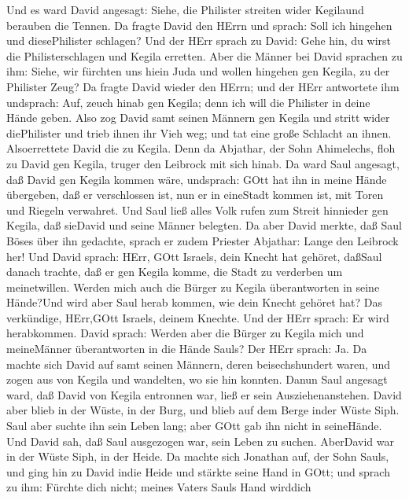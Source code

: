  Und es ward David angesagt: Siehe, die Philister streiten
wider Kegilaund berauben die Tennen.  Da fragte David den
HErrn und sprach: Soll ich hingehen und diesePhilister schlagen? Und der
HErr sprach zu David: Gehe hin, du wirst die Philisterschlagen und
Kegila erretten.  Aber die Männer bei David sprachen zu ihm:
Siehe, wir fürchten uns hiein Juda und wollen hingehen gen Kegila, zu
der Philister Zeug?  Da fragte David wieder den HErrn; und
der HErr antwortete ihm undsprach: Auf, zeuch hinab gen Kegila; denn ich
will die Philister in deine Hände geben.  Also zog David
samt seinen Männern gen Kegila und stritt wider diePhilister und trieb
ihnen ihr Vieh weg; und tat eine große Schlacht an ihnen. Alsoerrettete
David die zu Kegila.  Denn da Abjathar, der Sohn Ahimelechs,
floh zu David gen Kegila, truger den Leibrock mit sich hinab.
 Da ward Saul angesagt, daß David gen Kegila kommen wäre,
undsprach: GOtt hat ihn in meine Hände übergeben, daß er verschlossen
ist, nun er in eineStadt kommen ist, mit Toren und Riegeln verwahret.
 Und Saul ließ alles Volk rufen zum Streit hinnieder gen
Kegila, daß sieDavid und seine Männer belegten.  Da aber
David merkte, daß Saul Böses über ihn gedachte, sprach er zudem Priester
Abjathar: Lange den Leibrock her!  Und David sprach: HErr,
GOtt Israels, dein Knecht hat gehöret, daßSaul danach trachte, daß er
gen Kegila komme, die Stadt zu verderben um meinetwillen. 
Werden mich auch die Bürger zu Kegila überantworten in seine Hände?Und
wird aber Saul herab kommen, wie dein Knecht gehöret hat? Das
verkündige, HErr,GOtt Israels, deinem Knechte. Und der HErr sprach: Er
wird herabkommen.  David sprach: Werden aber die Bürger zu
Kegila mich und meineMänner überantworten in die Hände Sauls? Der HErr
sprach: Ja.  Da machte sich David auf samt seinen Männern,
deren beisechshundert waren, und zogen aus von Kegila und wandelten, wo
sie hin konnten. Danun Saul angesagt ward, daß David von Kegila
entronnen war, ließ er sein Ausziehenanstehen.  David aber
blieb in der Wüste, in der Burg, und blieb auf dem Berge inder Wüste
Siph. Saul aber suchte ihn sein Leben lang; aber GOtt gab ihn nicht in
seineHände.  Und David sah, daß Saul ausgezogen war, sein
Leben zu suchen. AberDavid war in der Wüste Siph, in der Heide.
 Da machte sich Jonathan auf, der Sohn Sauls, und ging hin
zu David indie Heide und stärkte seine Hand in GOtt;  und
sprach zu ihm: Fürchte dich nicht; meines Vaters Sauls Hand wirddich
